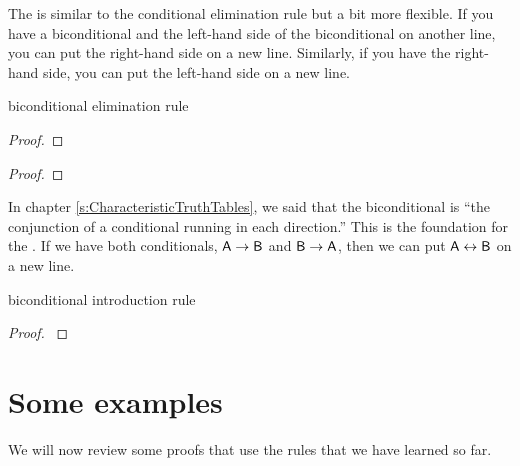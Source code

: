 The  is similar to the conditional elimination rule but a bit more flexible. If you have a biconditional and the left-hand side of the biconditional on another line, you can put the right-hand side on a new line. Similarly, if you have the right-hand side, you can put the left-hand side on a new line.
\begin{factboxy}{biconditional elimination rule}\label{be-rule}
\begin{proof}
	 
\end{proof}

\begin{proof}
	 
\end{proof}
\end{factboxy}

In chapter \ref{s:CharacteristicTruthTables}, we said that the biconditional is ``the conjunction of a conditional running in each direction.'' This is the foundation for the . If we have both conditionals, $\mathsf{A} \rightarrow \mathsf{B}$ and $\mathsf{B} \rightarrow \mathsf{A}$, then we can put $\mathsf{A} \leftrightarrow \mathsf{B}$ on a new line.

\begin{factboxy}{biconditional introduction rule}
\begin{proof}\label{eiff-I}
	 
\end{proof}
\end{factboxy}



\section{Some examples}

We will now review some proofs that use the rules that we have learned so far. 

